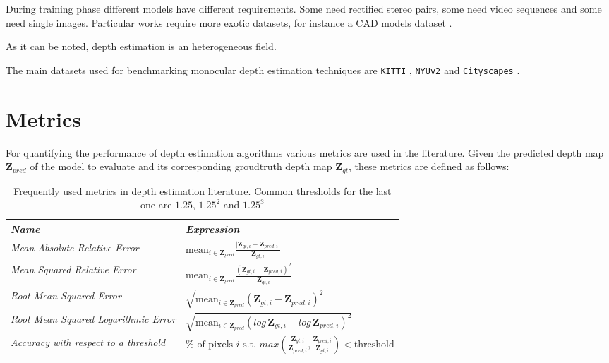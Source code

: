 During training phase different models have different requirements. Some need rectified stereo pairs, some need video sequences and some need single images. Particular works require more exotic datasets, for instance a CAD models dataset \cite{IM2CAD}.

As it can be noted, depth estimation is an heterogeneous field.

The main datasets used for benchmarking monocular depth estimation techniques are \texttt{KITTI} \cite{KITTI}, \texttt{NYUv2} \cite{NYUv2} and \texttt{Cityscapes} \cite{Cityscapes}.

\section{Metrics}

For quantifying the performance of depth estimation algorithms various metrics are used in the literature.
Given the predicted depth map $\mathbf{Z}_{pred}$ of the model to evaluate and its corresponding groudtruth depth map $\mathbf{Z}_{gt}$, these metrics are defined as follows:

\begin{table}
\centering
\begin{tabulary}{\textwidth}{lL}
\toprule
    \emph{Name} & \emph{Expression} \\
\midrule
    \textit{Mean Absolute Relative Error} & $\text{mean}_{i \in \mathbf{Z}_{pred}} \frac {\big| \mathbf{Z}_{gt, i} - \mathbf{Z}_{pred, i} \big|} {\mathbf{Z}_{gt, i}}$ \\
    \textit{Mean Squared Relative Error}  & $\text{mean}_{i \in \mathbf{Z}_{pred}} \frac {\left( \mathbf{Z}_{gt, i} - \mathbf{Z}_{pred, i} \right)^{2}} {\mathbf{Z}_{gt, i}}$ \\
    \textit{Root Mean Squared Error} & $\sqrt{
        \text{mean}_{i \in \mathbf{Z}_{pred}} \left( \mathbf{Z}_{gt, i} - \mathbf{Z}_{pred, i} \right)^{2}
    }$ \\
    \textit{Root Mean Squared Logarithmic Error} & $\sqrt{
        \text{mean}_{i \in \mathbf{Z}_{pred}} \left( log \, \mathbf{Z}_{gt, i} - log \, \mathbf{Z}_{pred, i} \right)^{2}
    }$ \\
    \textit{Accuracy with respect to a threshold} & $\% \text{ of pixels } i \text{ s.t. } max(
		\frac{\mathbf{Z}_{gt, i}}{\mathbf{Z}_{pred, i}},
		\frac{\mathbf{Z}_{pred, i}}{\mathbf{Z}_{gt, i}}
	) < \text{threshold}$ \\
\bottomrule
\end{tabulary}
\caption[Frequently used metrics]{
    Frequently used metrics in depth estimation literature.
    Common thresholds for the last one are $1.25$, $1.25^{2}$ and $1.25^{3}$
    \label{t:metrics}
}
\end{table}


